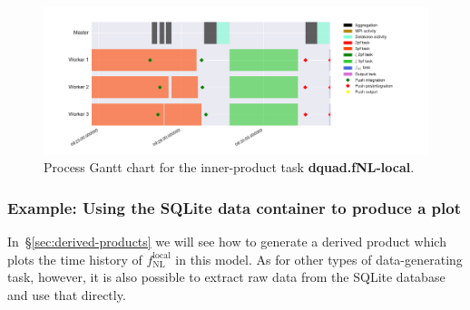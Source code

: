 \documentclass[11pt,a4paper]{article}
\newcommand{\fNL}{f_{\mathrm{NL}}}
\newcommand{\fNLlocal}{\fNL^{\text{local}}}
\newcommand{\repoobject}[1]{{\ttfamily\bfseries\small #1}}
\newcommand{\packagefont}{\sffamily}
\newcommand{\SQLite}{{\packagefont SQLite}}
\begin{document}
\begin{figure}
    \begin{center}
        \includegraphics[scale=0.5]{Outputs/gantt-fNL}    
    \end{center}
    \caption{\label{fig:gantt-fNL}Process Gantt chart for the inner-product task \repoobject{dquad.fNL-local}.}
\end{figure}

\subsubsection{Example: Using the {\SQLite} data container to produce a plot}
In~\S\ref{sec:derived-products}
we will see how to generate a derived product
which plots the time history of
$\fNLlocal$ in this model.
As for other types of data-generating task, however, it is also possible to extract
raw data from the {\SQLite} database
and use that directly.
\end{document}
